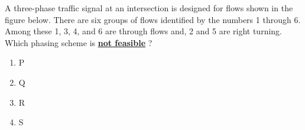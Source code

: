\item A three-phase traffic signal at an intersection is designed for flows shown in the figure below. There are six groups of flows identified by the numbers 1 through 6. Among these 1, 3, 4, and 6 are through flows and, 2 and 5 are right turning. Which phasing scheme is \textbf{\underline{not feasible}} ?
 \begin{figure}[!ht]
\centering
\resizebox{0.5\textwidth}{!}{%

}%
\end{figure}
\begin{table}[h!]
  \centering
  
\end{table} 
\begin{enumerate}
    \item P
    \item Q
    \item R
    \item S \\
\end{enumerate}
